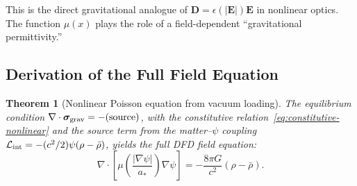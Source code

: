 \documentclass[11pt]{article}
\newtheorem{theorem}{Theorem}[section]
\newcommand{\vE}{\mathbf{E}}
\newcommand{\vD}{\mathbf{D}}
\begin{document}
This is the direct gravitational analogue of $\vD = \epsilon(|\vE|)\vE$
in nonlinear optics.  The function $\mu(x)$ plays the role of a
field-dependent ``gravitational permittivity.''

\subsection{Derivation of the Full Field Equation}

\begin{theorem}[Nonlinear Poisson equation from vacuum loading]
\label{thm:nonlinear-poisson}
The equilibrium condition $\nabla \cdot \bm{\sigma}_{\rm grav} = -(\text{source})$,
with the constitutive relation~\eqref{eq:constitutive-nonlinear} and
the source term from the matter--$\psi$ coupling $\mathcal{L}_{\rm int} = -(c^2/2)\psi(\rho - \bar\rho)$,
yields the full DFD field equation:
\begin{equation}
\boxed{
\nabla\cdot\!\left[\mu\!\left(\frac{|\nabla\psi|}{a_*}\right)\nabla\psi\right]
= -\frac{8\pi G}{c^2}(\rho - \bar\rho).
}
\label{eq:full-field}
\end{equation}
\end{theorem}
\end{document}
